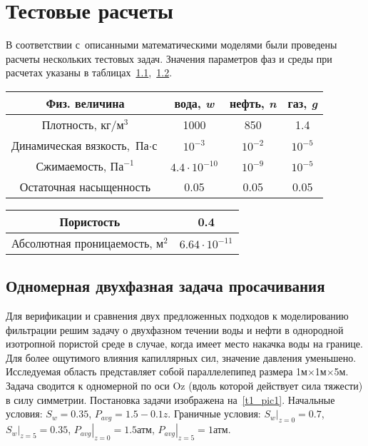 \chapter{Тестовые расчеты} \label{ch:ch3}

В соответствии с~описанными математическими моделями были проведены расчеты нескольких тестовых задач. Значения параметров фаз и среды при расчетах указаны в таблицах~\ref{tabular:liquids},~\ref{tabular:medium}.

\begin{table}[!ht]
\centering
\begin{tabular}{|c|c|c|c|}
\hline
Физ. величина & вода, \textit {w} & нефть, \textit {n} & газ, \textit {g} \\
\hline
Плотность,  $ {\text{кг}} / {\text{м}^3} $ & 1000 & 850 & 1.4 \\
\hline
Динамическая вязкость, $ \text{Па} \cdot \text{с} $ & $10^{-3}$ & $10^{-2}$ & $10^{-5}$ \\
\hline
Сжимаемость, $ \text{Па}^{-1}$ & $4.4 \cdot 10^{-10}$ & $10^{-9}$ & $10^{-5}$ \\
\hline
Остаточная насыщенность & 0.05 & 0.05 & 0.05 \\
\hline
\end{tabular}
\label{tabular:liquids}
\end{table}

\begin{table}[!ht]
\centering
\begin{tabular}{|c|c|}
\hline
Пористость & 0.4\\
\hline
Абсолютная проницаемость, $ \text{м}^{2}$ & $6.64 \cdot 10^{-11}$ \\
\hline
\end{tabular}
\label{tabular:medium}
\end{table}

\section{Одномерная двухфазная задача просачивания} \label{ch:ch3/sect1}

Для верификации и сравнения двух предложенных подходов к
моделированию фильтрации решим задачу о двухфазном течении воды и нефти
в однородной изотропной пористой среде в случае, когда имеет место накачка воды на границе.
Для более ощутимого влияния капиллярных сил, значение давления уменьшено.
Исследуемая область представляет собой параллелепипед размера 1м$\times$1м$\times$5м.
Задача сводится к одномерной по оси Oz (вдоль которой действует
сила тяжести) в силу симметрии. Постановка задачи изображена на~\ref{t1_pic1}.
Начальные условия: $S_w = 0.35$, $P_{avg} = 1.5 - 0.1z$.
Граничные условия: $\left.S_w\right|_{z = 0} = 0.7$, $\left.S_w\right|_{z = 5} = 0.35$, 
$\left.P_{avg}\right|_{z = 0} = 1.5 \text{атм}$, $\left.P_{avg}\right|_{z = 5} = 1 \text{атм}$.

